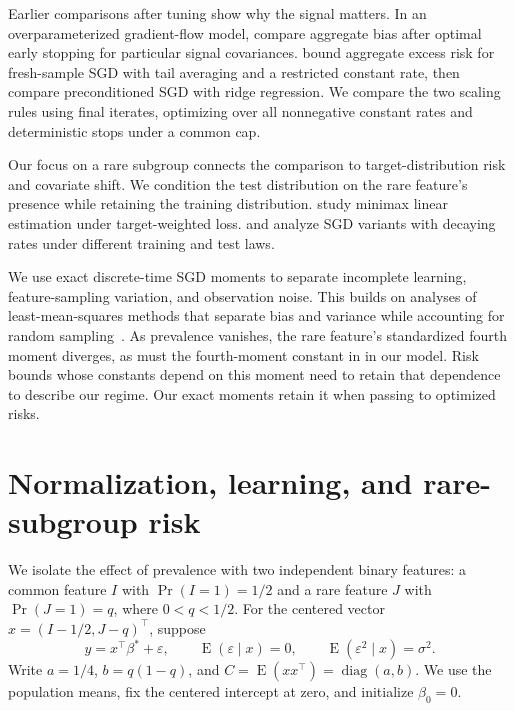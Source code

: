 \documentclass{alt2027}
\DeclareMathOperator{\diag}{diag}
\DeclareMathOperator{\E}{E}
\newcommand{\Prob}{\Pr}
\begin{document}
Earlier comparisons after tuning show why the signal matters. In an
overparameterized gradient-flow model,
\citet[Proposition 7]{amari2020preconditioning} compare aggregate bias after
optimal early stopping for particular signal covariances.
\citet[Theorem 4.2]{su2024preconditioning} bound aggregate excess risk for
fresh-sample SGD with tail averaging and a restricted constant rate, then
compare preconditioned SGD with ridge regression. We compare the two scaling
rules using final iterates, optimizing over all nonnegative constant rates and
deterministic stops under a common cap.

Our focus on a rare subgroup connects the comparison to target-distribution risk
and covariate shift. We condition the test distribution on the rare feature's
presence while retaining the training distribution. \citet{lei2021shift} study
minimax linear estimation under target-weighted loss. \citet{wu2022pretraining}
and \citet[Theorem 4]{liu2025precondition} analyze SGD variants with decaying
rates under different training and test laws.

We use exact discrete-time SGD moments to separate incomplete learning,
feature-sampling variation, and observation noise. This builds on analyses of
least-mean-squares methods that separate bias and variance while accounting for
random sampling~\citep{defossez2015averaged, jain2018parallelizing}. As
prevalence vanishes, the rare feature's standardized fourth moment diverges, as
must the fourth-moment constant in \citet[Assumption 3.2]{su2024preconditioning}
in our model. Risk bounds whose constants depend on this moment need to retain
that dependence to describe our regime. Our exact moments retain it when passing
to optimized risks.

\section{Normalization, learning, and rare-subgroup risk}
\label{sec:conference-setting}

We isolate the effect of prevalence with two independent binary features: a
common feature $I$ with $\Prob(I = 1) = 1/2$ and a rare feature $J$ with
$\Prob(J = 1) = q$, where $0 < q < 1/2$. For the centered vector
$x = (I - 1/2,J - q)^\top$, suppose
\[
  y = x^\top\beta^* + \varepsilon,\qquad \E(\varepsilon \mid x)
    = 0,\qquad \E(\varepsilon^2 \mid x)
    = \sigma^2.
\]
Write $a = 1/4$, $b = q(1 - q)$, and $C = \E(xx^\top) = \diag(a,b)$. We use the
population means, fix the centered intercept at zero, and initialize
$\beta_0 = 0$.
\end{document}
